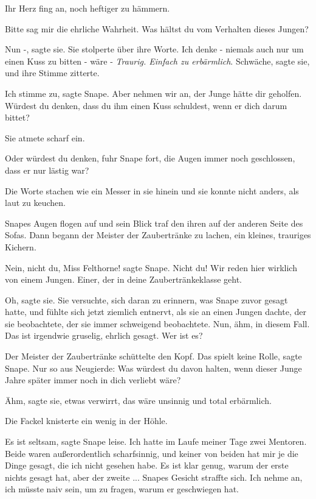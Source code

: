 Ihr Herz fing an, noch heftiger zu hämmern.

\glqq{}Bitte sag mir die ehrliche Wahrheit. Was hältst du vom Verhalten dieses
Jungen?\grqq{}

\glqq{}Nun -\grqq{}, sagte sie. Sie stolperte über ihre Worte. \glqq{}Ich denke -
niemals auch nur um einen Kuss zu bitten - wäre -\grqq{} \emph{Traurig. Einfach
zu erbärmlich}. \glqq{}Schwäche\grqq{}, sagte sie, und ihre Stimme zitterte.

\glqq{}Ich stimme zu\grqq{}, sagte Snape. \glqq{}Aber nehmen wir an, der Junge
hätte dir geholfen. Würdest du denken, dass du ihm einen Kuss schuldest, wenn er
dich darum bittet?\grqq{}

Sie atmete scharf ein.

\glqq{}Oder würdest du denken\grqq{}, fuhr Snape fort, die Augen immer noch
geschlossen, \glqq{}dass er nur lästig war?\grqq{}

Die Worte stachen wie ein Messer in sie hinein und sie konnte nicht anders, als
laut zu keuchen.

Snapes Augen flogen auf und sein Blick traf den ihren auf der anderen Seite des
Sofas. Dann begann der Meister der Zaubertränke zu lachen, ein kleines,
trauriges Kichern.

\glqq{}Nein, nicht du, Miss Felthorne!\grqq{} sagte Snape. \glqq{}Nicht du! Wir
reden hier wirklich von einem Jungen. Einer, der in deine Zaubertränkeklasse
geht.\grqq{}

\glqq{}Oh\grqq{}, sagte sie. Sie versuchte, sich daran zu erinnern, was Snape
zuvor gesagt hatte, und fühlte sich jetzt ziemlich entnervt, als sie an einen
Jungen dachte, der sie beobachtete, der sie immer schweigend beobachtete. \glqq{}
Nun, ähm, in diesem Fall. Das ist irgendwie gruselig, ehrlich gesagt. Wer ist
es?\grqq{}

Der Meister der Zaubertränke schüttelte den Kopf. \glqq{}Das spielt keine
Rolle\grqq{}, sagte Snape. \glqq{}Nur so aus Neugierde: Was würdest du davon
halten, wenn dieser Junge Jahre später immer noch in dich verliebt wäre?\grqq{}

\glqq{}Ähm\grqq{}, sagte sie, etwas verwirrt, \glqq{}das wäre unsinnig und total
erbärmlich.\grqq{}

Die Fackel knisterte ein wenig in der Höhle.

\glqq{}Es ist seltsam\grqq{}, sagte Snape leise. \glqq{}Ich hatte im Laufe meiner
Tage zwei Mentoren. Beide waren außerordentlich scharfsinnig, und keiner von
beiden hat mir je die Dinge gesagt, die ich nicht gesehen habe. Es ist klar
genug, warum der erste nichts gesagt hat, aber der zweite ...\grqq{} Snapes
Gesicht straffte sich. \glqq{}Ich nehme an, ich müsste naiv sein, um zu fragen,
warum er geschwiegen hat.\grqq{}

